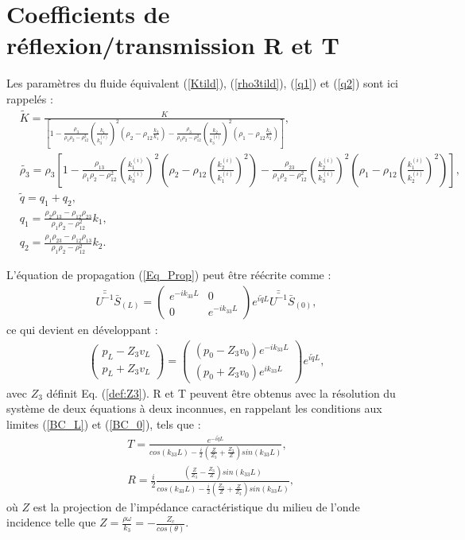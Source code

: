 \documentclass[twoside,openright]{report}
\begin{document}
\section{Coefficients de réflexion/transmission R et T}
\label{Ch_Dir_S_R/T}
    Les paramètres du fluide équivalent (\ref{Ktild}), (\ref{rho3tild}), (\ref{q1}) et (\ref{q2}) sont ici rappelés :
    \begin{align*}
    &\tilde{K}=\frac{K}{[1-\frac{\rho_3}{\rho_1\rho_2-\rho_{12}^2}(\frac{k_1}{k_3^{(i)}})^2(\rho_2-\rho_{12}\frac{k_2}{k_1})-\frac{\rho_3}{\rho_1\rho_2-\rho_{12}^2}(\frac{k_2}{k_3^{(i)}})^2(\rho_1-\rho_{12}\frac{k_1}{k_2})]},\\
    &\tilde{\rho_3}=\rho_3[1-\frac{\rho_{13}}{\rho_1\rho_2-\rho_{12}^2}(\frac{k_1^{(i)}}{k_3^{(i)}})^2(\rho_2-\rho_{12}(\frac{k_2^{(i)}}{k_1^{(i)}})^2)-\frac{\rho_{23}}{\rho_{1}\rho_2-\rho_{12}^2}(\frac{k_2^{(i)}}{k_3^{(i)}})^2(\rho_1-\rho_{12}(\frac{k_1^{(i)}}{k_2^{(i)}})^2)], \\
    &\tilde{q}=q_1+q_2,\\
    &q_{1}=\frac{\rho_2\rho_{13}-\rho_{12}\rho_{23}}{\rho_1\rho_2-\rho_{12}^2}k_1,\\
    &q_{2}= \frac{\rho_1\rho_{23}-\rho_{12}\rho_{13}}{\rho_1\rho_2-\rho_{12}^2}k_2.
    \end{align*}
    
    L'équation de propagation (\ref{Eq_Prop}) peut être réécrite comme :
    \begin{align}
         \bar{\bar{U^{-1}}}\bar{S}_{(L)}=\begin{pmatrix}
                        e^{-ik_{33}L} & 0 \\ 0 & e^{-ik_{33}L} 
                      \end{pmatrix} e^{i\tilde{q}L}\bar{\bar{U^{-1}}}\bar{S}_{(0)},
    \end{align}
    ce qui devient en développant :
    \begin{align}
    \begin{pmatrix}
		p_L-Z_3v_L \\ p_L+Z_3v_L
    \end{pmatrix}=\begin{pmatrix}
              		(p_0-Z_3v_0)e^{-i k_{33} L} \\ (p_0+Z_3v_0)e^{i k_{33} L}
            \end{pmatrix} e^{i \tilde{q} L},\label{eqDif_tmp}
    \end{align}  
    avec $Z_3$ définit Eq. (\ref{def:Z3}). R et T peuvent être obtenus avec la résolution du système de deux équations à deux inconnues, en rappelant les conditions aux limites (\ref{BC_L}) et (\ref{BC_0}), tels que :
    \begin{align}
    &T=\frac{e^{-i\tilde{q}L}}{cos(k_{33}L)-\frac{i}{2}(\frac{Z}{Z_3}+\frac{Z_3}{Z})sin(k_{33}L)}\label{Transmission},\\ 
    &R=\frac{i}{2} \frac{(\frac{Z}{Z_3}-\frac{Z_3}{Z})sin(k_{33}L)}{cos(k_{33}L)-\frac{i}{2}(\frac{Z_3}{Z}+\frac{Z}{Z_3})sin(k_{33}L)}\label{Reflexion},
    \end{align}
    où $Z$ est la projection de l'impédance caractéristique du milieu de l'onde incidence telle que $Z=\frac{\rho\omega}{k_3}=-\frac{Z_c}{cos(\theta)}$.
    
\end{document}
